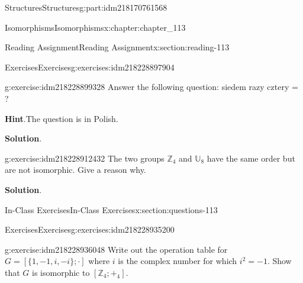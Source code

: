 \documentclass[oneside,10pt,]{book}
\newcommand{\blocktitlefont}{\relax}
\numberwithin{equation}{section}
\begin{document}
\begin{partptx}{Structures}{}{Structures}{}{}{g:part:idm218170761568}
\begin{chapterptx}{Isomorphisms}{}{Isomorphisms}{}{}{x:chapter:chapter_113}
\begin{sectionptx}{Reading Assignment}{}{Reading Assignment}{}{}{x:section:reading-113}
\typeout{************************************************}
%
\begin{exercises-subsection-numberless}{Exercises}{}{Exercises}{}{}{g:exercises:idm218228897904}
\par\medskip\noindent%
%
\begin{exercisegroup}
\begin{divisionexerciseeg}{1}{}{}{g:exercise:idm218228899328}%
Answer the following question:  siedem razy cztery = \textunderscore{}\textunderscore{}\textunderscore{}\textunderscore{}\textunderscore{}?%
\par\smallskip%
\noindent\textbf{\blocktitlefont Hint}.\hypertarget{g:hint:idm218228905280}{}\quad{}The question is in Polish.%
\par\smallskip%
\noindent\textbf{\blocktitlefont Solution}.\hypertarget{g:solution:idm218228910368}{}\quad{}%
\end{divisionexerciseeg}%
\begin{divisionexerciseeg}{2}{}{}{g:exercise:idm218228912432}%
The two groups \(\mathbb{Z}_4\) and \(\mathbb{U}_8\) have the same order but are not isomorphic.  Give a reason why.%
\par\smallskip%
\noindent\textbf{\blocktitlefont Solution}.\hypertarget{g:solution:idm218228927920}{}\quad{}%
\end{divisionexerciseeg}%
\end{exercisegroup}
\par\medskip\noindent
\end{exercises-subsection-numberless}
\end{sectionptx}
%
%
\typeout{************************************************}
\typeout{************************************************}
%
\begin{sectionptx}{In-Class Exercises}{}{In-Class Exercises}{}{}{x:section:questions-113}
%
%
%
\typeout{************************************************}
\typeout{************************************************}
%
\begin{exercises-subsection-numberless}{Exercises}{}{Exercises}{}{}{g:exercises:idm218228935200}
\par\medskip\noindent%
%
\begin{exercisegroup}
\begin{divisionexerciseeg}{1}{}{}{g:exercise:idm218228936048}%
Write out the operation table for \(G = [\{1, -1, i, -i \}; \cdot ]\) where \(i\) is the complex number for which \(i^2 = - 1\). Show that \(G\) is isomorphic to \(\left[\mathbb{Z}_4;+_4\right]\).%

\end{divisionexerciseeg}
\end{exercisegroup}
\end{exercises-subsection-numberless}
\end{sectionptx}
\end{chapterptx}
\end{partptx}
\end{document}
